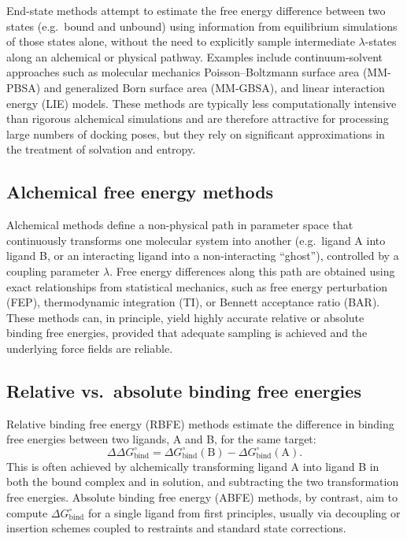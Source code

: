 \documentclass[12pt]{article}
\begin{document}
End-state methods attempt to estimate the free energy difference between two states (e.g.\ bound and unbound) using information from equilibrium simulations of those states alone, without the need to explicitly sample intermediate \(\lambda\)-states along an alchemical or physical pathway. 
Examples include continuum-solvent approaches such as molecular mechanics Poisson--Boltzmann surface area (MM-PBSA) and generalized Born surface area (MM-GBSA), and linear interaction energy (LIE) models.\cite{CH10_kollman1993free,CH10_homeyer2012mmpbsa,CH10_hansson1998lie} 
These methods are typically less computationally intensive than rigorous alchemical simulations and are therefore attractive for processing large numbers of docking poses, but they rely on significant approximations in the treatment of solvation and entropy. 

\subsection{Alchemical free energy methods}

Alchemical methods define a non-physical path in parameter space that continuously transforms one molecular system into another (e.g.\ ligand A into ligand B, or an interacting ligand into a non-interacting ``ghost''), controlled by a coupling parameter \(\lambda\).\cite{CH10_chipot2007free,CH10_choderamobley2011perspective} 
Free energy differences along this path are obtained using exact relationships from statistical mechanics, such as free energy perturbation (FEP), thermodynamic integration (TI), or Bennett acceptance ratio (BAR). 
These methods can, in principle, yield highly accurate relative or absolute binding free energies, provided that adequate sampling is achieved and the underlying force fields are reliable. 

\subsection{Relative vs.\ absolute binding free energies}

Relative binding free energy (RBFE) methods estimate the difference in binding free energies between two ligands, A and B, for the same target:
\[
\Delta\Delta G^\circ_\mathrm{bind} = \Delta G^\circ_\mathrm{bind}(\mathrm{B}) - \Delta G^\circ_\mathrm{bind}(\mathrm{A}). 
\]
This is often achieved by alchemically transforming ligand A into ligand B in both the bound complex and in solution, and subtracting the two transformation free energies. 
Absolute binding free energy (ABFE) methods, by contrast, aim to compute \(\Delta G^\circ_\mathrm{bind}\) for a single ligand from first principles, usually via decoupling or insertion schemes coupled to restraints and standard state corrections.\cite{CH10_gilson1997calculation,CH10_deng2009abfe,CH10_choderamobley2011perspective} 
\end{document}
